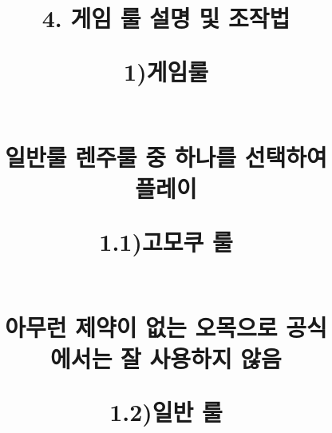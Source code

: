 \documentclass[a4paper, 11pt]{article}
\begin{document}
 \newpage
\title{\textbf{\Huge4. 게임 룰 설명 및 조작법 }
	\vspace{0.5cm}
	
	\textbf{\quad\Large1)게임룰}
	\begin{figure}[h]
		\begin{center}
			\vspace{0.3cm}
			\textbf{\\ 일반룰 렌주룰 중 하나를 선택하여 플레이}
			\vspace{3.2cm}  	
			\begin{flushleft}
			\textbf{\qquad\large1.1)고모쿠 룰}	
			\end{flushleft}
			
			
			\vspace{0.5cm}
			\textbf{\large\\아무런 제약이 없는 오목으로 공식에서는 잘 사용하지 않음}
		
		\end{center}
	\end{figure}
	
	
	
	
	\newpage
	\textbf{\quad\large1.2)일반 룰}
	\begin{figure}[h]
		\begin{center}
			

\end{center}
\end{figure}}
\end{document}
